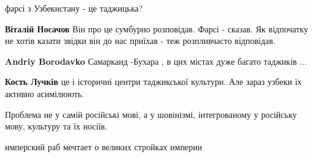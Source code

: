 \begin{itemize}
фарсі з Узбекистану - це таджицька?

\begin{itemize}
 
\textbf{Віталій Носачов}
Він про це сумбурно розповідав. Фарсі - сказав.
Як відпочатку не хотів казати звідки він до нас приїхав - теж розпливчасто відповідав.

 
\textbf{Andriy Borodavko} Самарканд -Бухара , в цих містах дуже багато таджиків ...

 
\textbf{Кость Лучків} це і історичні центри таджикської культури. Але зараз узбеки їх активно асимілюють.
\end{itemize}

 
Проблема не у самій російські мові, а у шовінізмі, інтегрованому у російську мову, культуру та їх носіїв.

 
имперский раб мечтает о великих стройках империи

 

\end{itemize}
